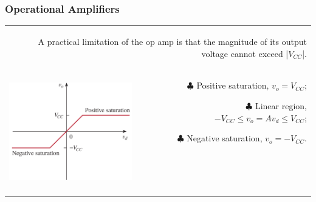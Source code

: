 \documentclass[aspectratio=169]{beamer}
\begin{document}
\begin{frame}[fragile]
\frametitle{Operational Amplifiers}
\begin{tabular}{r}
	\begin{columns}	\column{1\textwidth}
	A practical limitation of the op amp is that the magnitude of its output voltage cannot exceed |$V_{CC}$|.
\newline
	\end{columns} \\
	\begin{columns}
		\begin{column}{.4\textwidth}  %
			\includegraphics[height=4.5cm]{figura10.png}

		\end{column}
		\begin{column}{.6\textwidth}  %
		    \begin{itemize}
		    \item[$\clubsuit$]{Positive saturation, $v_{o}=V_{CC}$;\newline}
		    \item[$\clubsuit$]{Linear region, $-V_{CC} \leq v_{o}= Av_{d} \leq V_{CC}$;\newline}	
		    \item[$\clubsuit$]{Negative saturation, $v_{o}=-V_{CC}$.}			
		  \end{itemize}
		\end{column}	
	\end{columns} \\
\end{tabular}
\end{frame}
\end{document}
